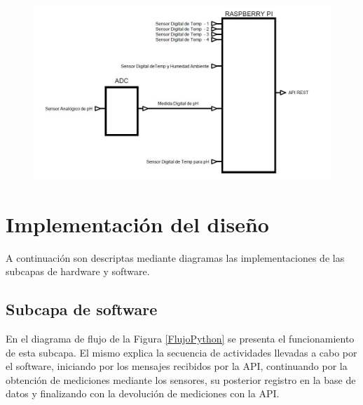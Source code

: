                 \begin{figure}[h]
                    \centering
                    \includegraphics[scale=0.65]{EsquemaDesigndeHardware.jpg}
                    \label{fig:EsquemaHardware}            
                \end{figure} \hfill \break
        
\section{Implementación del diseño}
    \par A continuación son descriptas mediante diagramas las implementaciones de las subcapas de hardware y software.
  
    \subsection{Subcapa de software}
        \par En el diagrama de flujo de la Figura \ref{FlujoPython} se presenta el funcionamiento de esta subcapa. El mismo explica la secuencia de actividades llevadas a cabo por el software, iniciando por los mensajes recibidos por la API, continuando por la obtención de mediciones mediante los sensores, su posterior registro en la base de datos y finalizando con la devolución de mediciones con la API.

